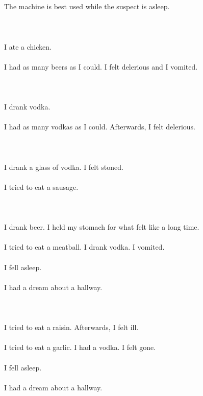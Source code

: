 \documentclass{article}
\begin{document}
    \section{}
    The machine is best used while the suspect is asleep.\\\\ 
    \newpage
    
    \section{}
    I ate a chicken.\\\\I had as many beers as I could. I felt delerious and I vomited.\\\\ 
    \newpage
    
    \section{}
    I drank vodka.\\\\I had as many vodkas as I could. Afterwards, I felt delerious.\\\\ 
    \newpage
    
    \section{}
    I drank a glass of vodka. I felt stoned.\\\\I tried to eat a sausage.\\\\ 
    \newpage
    
    \section{}
    I drank beer. I held my stomach for what felt like a long time.\\\\I tried to eat a meatball. I drank vodka. I vomited.\\\\I fell asleep.\\\\I had a dream about a hallway.\\\\ 
    \newpage
    
    \section{}
    I tried to eat a raisin. Afterwards, I felt ill.\\\\I tried to eat a garlic. I had a vodka. I felt gone.\\\\I fell asleep.\\\\I had a dream about a hallway.\\\\ 
    \newpage
    
\end{document}
